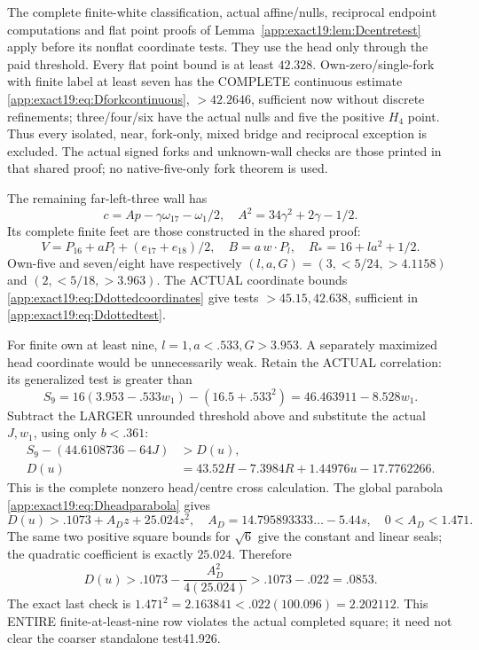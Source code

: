 \documentclass[11pt]{article}
\theoremstyle{definition}
\theoremstyle{remark}
\begin{document}
The complete finite-white classification, actual affine/nulls,
reciprocal endpoint computations and flat point proofs of
Lemma~\ref{app:exact19:lem:Dcentretest} apply before its nonflat
coordinate tests. They use the head only through the paid threshold.
Every flat point bound is at least \(42.328\).
Own-zero/single-fork with finite label at least seven has the COMPLETE
continuous estimate \eqref{app:exact19:eq:Dforkcontinuous},
\(>42.2646\), sufficient now without discrete refinements;
three/four/six have the actual nulls and five the positive \(H_4\) point.
Thus every isolated, near, fork-only, mixed bridge and reciprocal
exception is excluded. The actual signed forks and unknown-wall checks
are those printed in that shared proof; no native-five-only fork theorem
is used.

The remaining far-left-three wall has
\[
 c=Ap-\gamma\omega_{17}-\omega_1/2,\quad
                                  A^2=34\gamma^2+2\gamma-1/2 .
\]
Its complete finite feet are those constructed in the shared proof:
\[
 V=P_{16}+aP_l+(e_{17}+e_{18})/2,\quad
                       B=a\,w\cdot P_l,\quad R_*=16+la^2+1/2 .
\]
Own-five and seven/eight have respectively
\((l,a,G)=(3,<5/24,>4.1158)\) and \((2,<5/18,>3.963)\).
The ACTUAL coordinate bounds \eqref{app:exact19:eq:Ddottedcoordinates}
give tests \(>45.15,42.638\), sufficient in
\eqref{app:exact19:eq:Ddottedtest}.

For finite own at least nine, \(l=1,a<.533,G>3.953\).
A separately maximized head coordinate would be unnecessarily weak.
Retain the ACTUAL correlation: its generalized test is greater than
\[
 S_9=16(3.953-.533w_1)-(16.5+.533^2)=46.463911-8.528w_1 .
\]
Subtract the LARGER unrounded threshold above and substitute the
actual \(J,w_1\), using only \(b<.361\):
\[
\begin{split}
 S_9-(44.6108736-64J)&>D(u),\\
 D(u)&=43.52H-7.3984R+1.44976u-17.7762266 .
\end{split}
\tag{D19correlated}\label{app:exact19:eq:Dcorrelated}
\]
This is the complete nonzero head/centre cross calculation.
The global parabola \eqref{app:exact19:eq:Dheadparabola} gives
\[
 D(u)>.1073+A_Dz+25.024z^2,\quad
 A_D=14.795893333\ldots-5.44s,\quad0<A_D<1.471 .
\]
The same two positive square bounds for \(\sqrt6\) give the constant
and linear seals; the quadratic coefficient is exactly \(25.024\).
Therefore
\[
                D(u)>.1073-\frac{A_D^2}{4(25.024)}
                              >.1073-.022=.0853 .
\]
The exact last check is
\(1.471^2=2.163841<.022(100.096)=2.202112\).
This ENTIRE finite-at-least-nine row violates the actual completed
square; it need not clear the coarser standalone test41.926.
\end{document}
